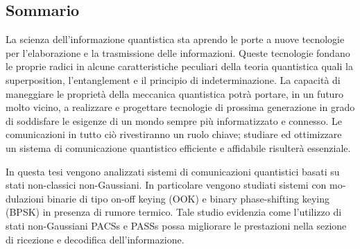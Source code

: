 
\begin{otherlanguage}{italian}
\chapter*{Sommario}
    La scienza dell'informazione quantistica sta aprendo le porte a nuove tecnologie per l'elaborazione e 
    la trasmissione delle informazioni. Queste tecnologie fondano le proprie radici
    in alcune caratteristiche peculiari della teoria quantistica quali la \foreignlanguage{english}{
    superposition}, l'\foreignlanguage{english}{entanglement} e il principio di indeterminazione.
    La capacità di maneggiare le proprietà della meccanica quantistica potrà portare, 
    in un futuro molto vicino, a realizzare e progettare tecnologie di prossima generazione 
    in grado di soddisfare le esigenze di un mondo sempre
    più informatizzato e connesso.
    Le comunicazioni in tutto ciò rivestiranno un ruolo chiave; studiare ed ottimizzare un sistema
    di comunicazione quantistico efficiente e affidabile risulterà essenziale.

    In questa tesi vengono analizzati sistemi di comunicazioni quantistici basati su stati non-classici 
    non-Gaussiani. In particolare vengono studiati sistemi con modulazioni binarie di tipo on-off 
    keying (OOK) e binary phase-shifting keying (BPSK) in presenza di rumore termico. Tale studio 
    evidenzia come l'utilizzo di stati non-Gaussiani PACSs e PASSs possa migliorare le prestazioni 
    nella sezione di ricezione e decodifica dell'informazione.
\end{otherlanguage}